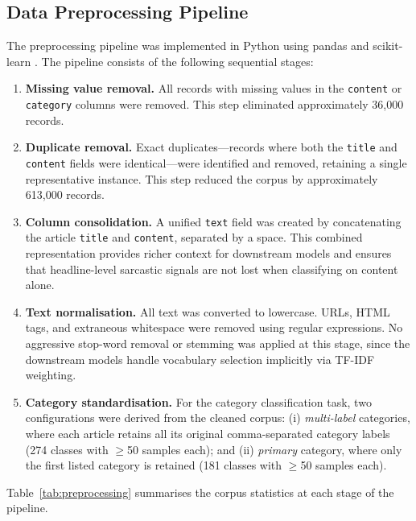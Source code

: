 \documentclass[12pt,a4paper]{article}
\begin{document}
\subsection{Data Preprocessing Pipeline}
\label{subsec:preprocessing}

The preprocessing pipeline was implemented in Python using pandas and scikit-learn \citep{pedregosa2011scikit}. The pipeline consists of the following sequential stages:

\begin{enumerate}[leftmargin=1.5em, itemsep=0.3em]
    \item \textbf{Missing value removal.} All records with missing values in the \texttt{content} or \texttt{category} columns were removed. This step eliminated approximately 36,000 records.

    \item \textbf{Duplicate removal.} Exact duplicates---records where both the \texttt{title} and \texttt{content} fields were identical---were identified and removed, retaining a single representative instance. This step reduced the corpus by approximately 613,000 records.

    \item \textbf{Column consolidation.} A unified \texttt{text} field was created by concatenating the article \texttt{title} and \texttt{content}, separated by a space. This combined representation provides richer context for downstream models and ensures that headline-level sarcastic signals are not lost when classifying on content alone.

    \item \textbf{Text normalisation.} All text was converted to lowercase. URLs, HTML tags, and extraneous whitespace were removed using regular expressions. No aggressive stop-word removal or stemming was applied at this stage, since the downstream models handle vocabulary selection implicitly via TF-IDF weighting.

    \item \textbf{Category standardisation.} For the category classification task, two configurations were derived from the cleaned corpus: (i) \textit{multi-label} categories, where each article retains all its original comma-separated category labels (274 classes with $\geq$50 samples each); and (ii) \textit{primary} category, where only the first listed category is retained (181 classes with $\geq$50 samples each).
\end{enumerate}

Table~\ref{tab:preprocessing} summarises the corpus statistics at each stage of the pipeline.
\end{document}
